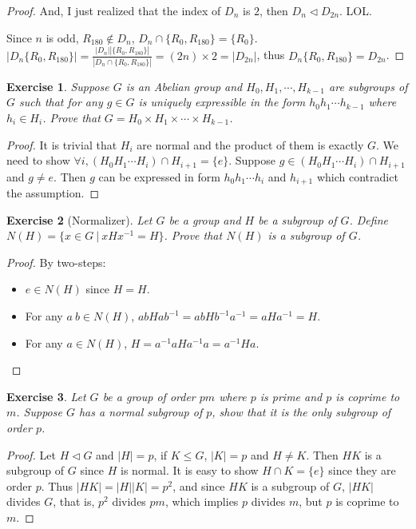 \documentclass[14pt]{extarticle}
\newtheorem{exercise}{Exercise}[section]
\newcommand{\inv}[1]{#1^{-1}}
\newcommand{\join}[3][,]{#2_0 #1 #2_1 #1 \cdots #1 #2_{#3}}
\newcommand{\normalin}{\triangleleft}
\newcommand{\1}{\{ e \}}
\begin{document}
\begin{proof}
  And, I just realized that the index of $D_n$ is $2$, then $D_n \normalin D_{2n}$.
  LOL.

  Since $n$ is odd, $R_{180} \notin D_n$, $D_n \cap \{ R_0 , R_{180} \} = \{ R_0 \}$. \\
  $\displaystyle |D_n \{ R_0 , R_{180} \}| = \frac{|D_n| |\{ R_0 , R_{180} \}|}{|D_n \cap \{ R_0 , R_{180} \}|} = (2n) \times 2 = |D_{2n}|$,
  thus $D_n \{ R_0 , R_{180} \} = D_{2n}$.
\end{proof}

\begin{exercise}
  Suppose $G$ is an Abelian group and $\join[,]{H}{k - 1}$ are
  subgroups of $G$ such that for any $g \in G$ is uniquely expressible
  in the form $\join[]{h}{k - 1}$ where $h_i \in H_i$.
  Prove that $G = \join[\times]{H}{k - 1}$.
\end{exercise}
\begin{proof}
  It is trivial that $H_i$ are normal and the product of them is exactly $G$.
  We need to show $\forall i, (\join[]{H}{i}) \cap H_{i + 1} = \1$.
  Suppose $g \in (\join[]{H}{i}) \cap H_{i + 1}$ and $g \neq e$.
  Then $g$ can be expressed in form $\join[]{h}{i}$ and $h_{i + 1}$
  which contradict the assumption.
\end{proof}

\begin{exercise}[Normalizer]
  Let $G$ be a group and $H$ be a subgroup of $G$.
  Define $N(H) = \{ x \in G \ | \ xH\inv{x} = H \}$.
  Prove that $N(H)$ is a subgroup of $G$.
\end{exercise}
\begin{proof}
  By two-steps:
  \begin{itemize}
    \item $e \in N(H)$ since $H = H$.
    \item For any $a \ b \in N(H)$, $abH\inv{ab} = abH\inv{b}\inv{a} = aH\inv{a} = H$.
    \item For any $a \in N(H)$, $H = \inv{a}aH\inv{a}a = \inv{a}Ha$.
  \end{itemize}
\end{proof}

\setcounter{exercise}{88}
\begin{exercise}
  Let $G$ be a group of order $pm$ where $p$ is prime and $p$ is coprime to $m$.
  Suppose $G$ has a normal subgroup of $p$, show that it is the only subgroup of order $p$.
\end{exercise}
\begin{proof}
  Let $H \normalin G$ and $|H| = p$, if $K \leq G$, $|K| = p$ and $H \neq K$.
  Then $HK$ is a subgroup of $G$ since $H$ is normal.
  It is easy to show $H \cap K = \1$ since they are order $p$.
  Thus $|HK| = |H||K| = p^2$, and since $HK$ is a subgroup of $G$, $|HK|$ divides $G$,
  that is, $p^2$ divides $pm$, which implies $p$ divides $m$, but $p$ is coprime to $m$.
\end{proof}
\end{document}
